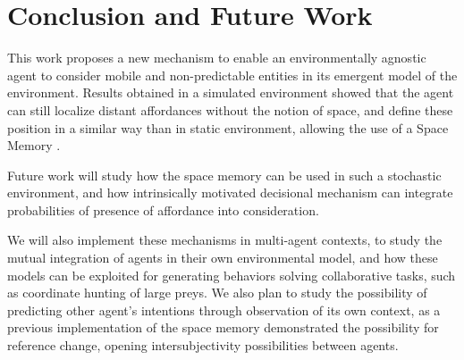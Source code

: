 \documentclass[conference]{IEEEtran}
\makeatletter
\let\cite\relax
\DeclareRobustCommand{\cite}{%
	\let\new@cite@pre\@gobble
	\@ifnextchar[\new@cite{\@citex[]}}
\def\new@cite[#1]{\@ifnextchar[{\new@citea{#1}}{\@citex[#1]}}
\def\new@citea#1{\def\new@cite@pre{#1}\@citex}
\makeatother
\begin{document}
\section{Conclusion and Future Work}\label{conclusion}

This work proposes a new mechanism to enable an environmentally agnostic agent to consider mobile and non-predictable entities in its emergent model of the environment. Results obtained in a simulated environment showed that the agent can still localize distant affordances without the notion of space, and define these position in a similar way than in static environment, allowing the use of a Space Memory \cite{gay:space}.

Future work will study how the space memory can be used in such a stochastic environment, and how intrinsically motivated decisional mechanism can integrate probabilities of presence of affordance into consideration.

We will also implement these mechanisms in multi-agent contexts, to study the mutual integration of agents in their own environmental model, and how these models can be exploited for generating behaviors solving collaborative tasks, such as coordinate hunting of large preys. We also plan to study the possibility of predicting other agent's intentions through observation of its own context, as a previous implementation of the space memory demonstrated the possibility for reference change, opening intersubjectivity possibilities between agents.




\end{document}
